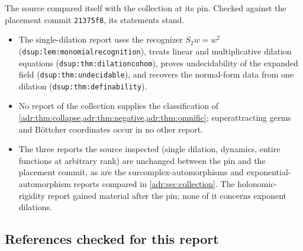 \documentclass[11pt,letterpaper]{article}
\numberwithin{equation}{section}
\theoremstyle{definition}
\theoremstyle{remark}
\newcommand{\lbl}[1]{\nolinkurl{#1}}%
\begin{document}
The source compared itself with the collection at its pin. Checked against
the placement commit \texttt{21375f8}, its statements stand.
\begin{itemize}[leftmargin=*,itemsep=3pt]
\item The single-dilation report uses the recognizer $S_2w=w^2$
(\lbl{dsup:lem:monomialrecognition}), treats linear and multiplicative
dilation equations (\lbl{dsup:thm:dilationcohom}), proves undecidability
of the expanded field (\lbl{dsup:thm:undecidable}), and recovers the
normal-form data from one dilation (\lbl{dsup:thm:definability}).
\item No report of the collection supplies the classification of
\cref{adr:thm:collapse,adr:thm:negative,adr:thm:omnific}; superattracting
germs and B\"ottcher coordinates occur in no other report.
\item The three reports the source inspected (single dilation, dynamics,
entire functions at arbitrary rank) are unchanged between the pin and the
placement commit, as are the surcomplex-automorphisms and
exponential-automorphism reports compared in \cref{adr:sec:collection}.
The holonomic-rigidity report gained material after the pin; none of it
concerns exponent dilations.
\end{itemize}

\subsection{References checked for this report}\label{adr:app:literature}
\end{document}
